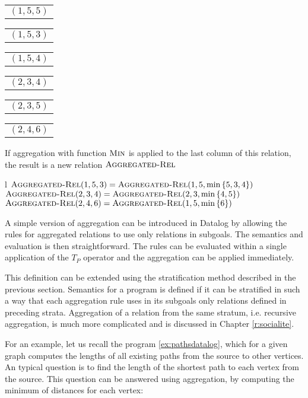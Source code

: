 \begin{center}
\begin{tabular}{l}
  $(1, 5, 5)$
\end{tabular}
\quad
\begin{tabular}{l}
  $(1, 5, 3)$
\end{tabular}
\quad
\begin{tabular}{l}
  $(1, 5, 4)$
\end{tabular}
\quad
\begin{tabular}{l}
  $(2, 3, 4)$
\end{tabular}
\quad
\begin{tabular}{l}
  $(2, 3, 5)$
\end{tabular}
\quad
\begin{tabular}{l}
  $(2, 4, 6)$
\end{tabular}
\end{center}


If aggregation with function $\textsc{Min}$ is applied to the last column of this relation, the result is a new relation $\textsc{Aggregated-Rel}$

\begin{centab}{ l }
  $\textsc{Aggregated-Rel}(1, 5, 3) = \textsc{Aggregated-Rel}(1, 5, \min{\{5, 3, 4\}})$ \\
  $\textsc{Aggregated-Rel}(2, 3, 4) = \textsc{Aggregated-Rel}(2, 3, \min{\{4, 5\}})$ \\
  $\textsc{Aggregated-Rel}(2, 4, 6) = \textsc{Aggregated-Rel}(1, 5, \min{\{6\}})$ \\
\end{centab}

A simple version of aggregation can be introduced in Datalog by allowing the rules for aggregated relations to use only \edb relations in subgoals. The semantics and evaluation is then straightforward. The rules can be evaluated within a single application of the $T_P$ operator and the aggregation can be applied immediately.

This definition can be extended using the stratification method described in the previous section. Semantics for a program is defined if it can be stratified in such a way that each aggregation rule uses in its subgoals only relations defined in preceding strata. Aggregation of a relation from the same stratum, i.e. recursive aggregation, is much more complicated and is discussed in Chapter \ref{r:socialite}.

For an example, let us recall the program \ref{ex:pathsdatalog}, which for a given graph computes the lengths of all existing paths from the source to other vertices. An typical question is to find the length of the shortest  path to each vertex from the source. This question can be answered using aggregation, by computing the minimum of distances for each vertex: 


